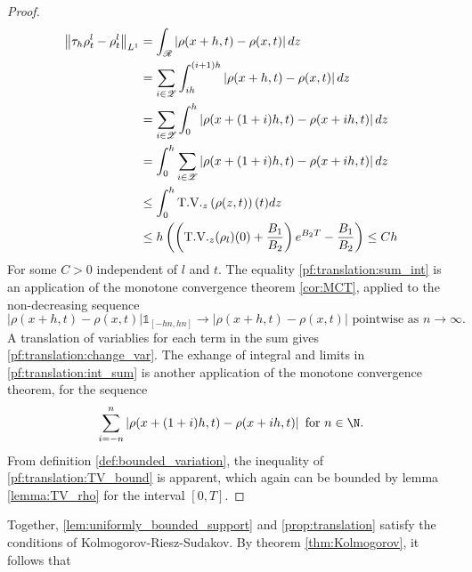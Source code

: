 	\begin{proof}
		\begin{align}
			\left\lVert\tau_h \rho^l_t - \rho^l_t\right\rVert_{L^1} &= \int_{\mathscr{R}} \left| \rho(x+h,t) - \rho(x,t) \right| dz \\
			&=\sum_{i \in \mathscr{Z}} \int_{ i h}^{(i+1)h} \left| \rho(x+h,t) - \rho(x,t) \right| dz \label{pf:translation:sum_int}\\
			&=\sum_{i \in \mathscr{Z}} \int_{0}^{h} \left| \rho(x+(1+i)h,t) - \rho(x +  i h,t) \right| dz \label{pf:translation:change_var}\\
			&=\int_{0}^{h} \sum_{i \in \mathscr{Z}}  \left| \rho(x+(1+i)h,t) - \rho(x +  i h,t) \right| dz \label{pf:translation:int_sum}\\
			&\leq \int_{0}^{h} \text{T.V.}_z\left(\rho(z,t)\right)(t) dz \label{pf:translation:TV_bound}\\
			&\leq h \left(\left(\text{T.V.}_z(\rho_l)(0) + \frac{B_1}{B_2}\right) e^{B_2 T} - \frac{B_1}{B_2}\right)
			\leq C h			\label{pf:translation:uniform_mod}
		\end{align}
	For some $C > 0$ independent of $l$ and $t$. The equality \eqref{pf:translation:sum_int} is an application of the monotone convergence theorem \eqref{cor:MCT}, applied to the non-decreasing sequence
	\begin{equation}
		\left| \rho(x+h,t) - \rho(x,t) \right|\mathbb{1}_{[-hn, hn]}  \rightarrow 	\left| \rho(x+h,t) - \rho(x,t) \right| \text{ pointwise as } n \rightarrow \infty.\nonumber 
	\end{equation}
	A translation of variablies for each term in the sum gives \eqref{pf:translation:change_var}. The exhange of integral and limits in \eqref{pf:translation:int_sum} is another application of the monotone convergence theorem, for the sequence 
	\begin{equation}
		\sum_{i = -n}^n  \left| \rho(x+(1+i)h,t) - \rho(x +  i h,t) \right| \text{ for } n \in \N.
	\end{equation}
	From definition \eqref{def:bounded_variation}, the inequality of \eqref{pf:translation:TV_bound} is apparent, which again can be bounded by lemma \eqref{lemma:TV_rho} for the interval $[0,T]$. 
	
	\end{proof}


Together, \eqref{lem:uniformly_bounded_support} and \eqref{prop:translation} satisfy the conditions of Kolmogorov-Riesz-Sudakov. By theorem \eqref{thm:Kolmogorov}, it follows that

